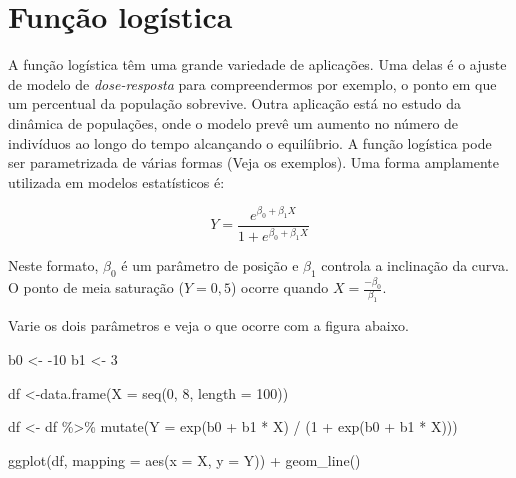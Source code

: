 \documentclass[
]{book}
\newenvironment{Shaded}{\begin{snugshade}}{\end{snugshade}}
\newcommand{\AttributeTok}[1]{\textcolor[rgb]{0.77,0.63,0.00}{#1}}
\newcommand{\DecValTok}[1]{\textcolor[rgb]{0.00,0.00,0.81}{#1}}
\newcommand{\FunctionTok}[1]{\textcolor[rgb]{0.00,0.00,0.00}{#1}}
\newcommand{\NormalTok}[1]{#1}
\newcommand{\OtherTok}[1]{\textcolor[rgb]{0.56,0.35,0.01}{#1}}
\newcommand{\SpecialCharTok}[1]{\textcolor[rgb]{0.00,0.00,0.00}{#1}}
\begin{document}
\hypertarget{funuxe7uxe3o-loguxedstica}{%
\section{Função logística}\label{funuxe7uxe3o-loguxedstica}}

A função logística têm uma grande variedade de aplicações. Uma delas é o ajuste de modelo de \emph{dose-resposta} para compreendermos por exemplo, o ponto em que um percentual da população sobrevive. Outra aplicação está no estudo da dinâmica de populações, onde o modelo prevê um aumento no número de indivíduos ao longo do tempo alcançando o equilíibrio. A função logística pode ser parametrizada de várias formas (Veja os exemplos). Uma forma amplamente utilizada em modelos estatísticos é:

\[Y = \frac{e^{\beta_0 + \beta_1 X}}{1 + e^{\beta_0 + \beta_1 X}}\]

Neste formato, \(\beta_0\) é um parâmetro de posição e \(\beta_1\) controla a inclinação da curva. O ponto de meia saturação (\(Y = 0,5\)) ocorre quando \(X = \frac{-\beta_0}{\beta_1}\).

Varie os dois parâmetros e veja o que ocorre com a figura abaixo.

\begin{Shaded}
\begin{Highlighting}[]
\NormalTok{b0 }\OtherTok{\textless{}{-}} \SpecialCharTok{{-}}\DecValTok{10}
\NormalTok{b1 }\OtherTok{\textless{}{-}} \DecValTok{3}

\NormalTok{df }\OtherTok{\textless{}{-}}\FunctionTok{data.frame}\NormalTok{(}\AttributeTok{X =} \FunctionTok{seq}\NormalTok{(}\DecValTok{0}\NormalTok{, }\DecValTok{8}\NormalTok{, }\AttributeTok{length =} \DecValTok{100}\NormalTok{))}

\NormalTok{df }\OtherTok{\textless{}{-}}\NormalTok{ df }\SpecialCharTok{\%\textgreater{}\%} \FunctionTok{mutate}\NormalTok{(}\AttributeTok{Y =} \FunctionTok{exp}\NormalTok{(b0 }\SpecialCharTok{+}\NormalTok{ b1 }\SpecialCharTok{*}\NormalTok{ X) }\SpecialCharTok{/}\NormalTok{ (}\DecValTok{1} \SpecialCharTok{+} \FunctionTok{exp}\NormalTok{(b0 }\SpecialCharTok{+}\NormalTok{ b1 }\SpecialCharTok{*}\NormalTok{ X)))}

\FunctionTok{ggplot}\NormalTok{(df, }\AttributeTok{mapping =} \FunctionTok{aes}\NormalTok{(}\AttributeTok{x =}\NormalTok{ X, }\AttributeTok{y =}\NormalTok{ Y)) }\SpecialCharTok{+}
  \FunctionTok{geom\_line}\NormalTok{()}
\end{Highlighting}
\end{Shaded}
\end{document}
